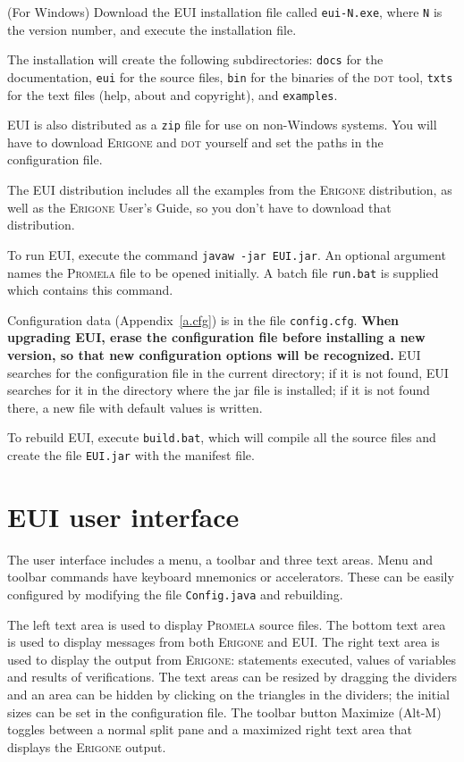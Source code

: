 \documentclass[11pt]{article}
\newcommand{\eri}{\textsc{Erigone}}
\newcommand{\prm}{\textsc{Promela}}
\newcommand{\eui}{\textsc{EUI}}
\newcommand{\p}[1]{\texttt{#1}}
\newcommand{\bu}[1]{\textsf{#1}}
\begin{document}
(For Windows) Download the \eui{} installation file called \p{eui-N.exe},
where \p{N} is the version number, and execute the installation file.

The installation will create the following subdirectories: \p{docs} for
the documentation, \p{eui} for the source files, \p{bin} for the
binaries of the \textsc{dot} tool, \p{txts} for the text files (help,
about and copyright), and \p{examples}.

\eui{} is also distributed as a \p{zip} file for use on non-Windows
systems. You will have to download \eri{} and \textsc{dot} yourself and
set the paths in the configuration file.

The \eui{} distribution includes all the examples from the \eri{}
distribution, as well as the \eri{} User's Guide, so you don't have to
download that distribution.

To run \eui{}, execute the command \p{javaw -jar EUI.jar}.
An optional argument names the \prm{} file to be opened initially.
A batch file \p{run.bat} is supplied which contains this command.

Configuration data (Appendix~\ref{a.cfg}) is in the file
\p{config.cfg}.
\textbf{When upgrading \eui{}, erase the configuration file before installing
a new version, so that new configuration options will be recognized.}
\eui{} searches for the configuration file in the current
directory; if it is not found, \eui{} searches for it in the directory
where the jar file is installed; if it is not found there, a new file
with default values is written.

To rebuild \eui{}, execute \p{build.bat}, which will compile all the source
files and create the file \p{EUI.jar} with the manifest file.

\section{\eui{} user interface}
The user interface includes a menu, a toolbar and three text areas.
Menu and toolbar commands have keyboard mnemonics or accelerators.
These can be easily configured by modifying the file \p{Config.java} and
rebuilding.

The left text area is used to display \prm{} source files. The bottom
text area is used to display messages from both \eri{} and \eui{}. The
right text area is used to display the output from \eri{}: statements
executed, values of variables and results of verifications. The text
areas can be resized by dragging the dividers and an area can be hidden
by clicking on the triangles in the dividers; the initial sizes can be
set in the configuration file. The toolbar button \bu{Maximize}
(\bu{Alt-M}) toggles between a normal split pane and a maximized right
text area that displays the \eri{} output.
\end{document}
